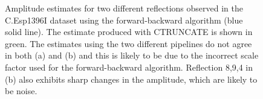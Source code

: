 \begin{figure}
\begin{subfigure}[b]{1.0\textwidth}
            \caption{}
            \label{fig:Amplitude estimates ref 8,9,4 - C.Esp1396I}
    \end{subfigure}
    \caption[Amplitude estimates for two different reflections observed in the C.Esp1396I dataset using the forward-backward algorithm.]{Amplitude estimates for two different reflections observed in the C.Esp1396I dataset using the forward-backward algorithm (blue solid line).
    The estimate produced with CTRUNCATE is shown in green.
    The estimates using the two different pipelines do not agree in both (a) and (b) and this is likely to be due to the incorrect scale factor used for the forward-backward algorithm.
    Reflection 8,9,4 in (b) also exhibits sharp changes in the amplitude, which are likely to be noise.}
    \label{fig:Amplitude estimates - C.Esp1396I}
\end{figure}

